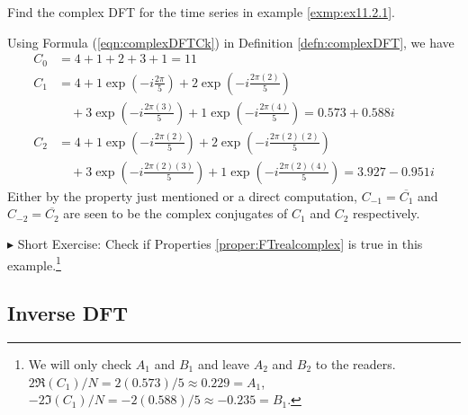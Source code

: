 \begin{exmp}
\label{exmp:ex11.2.2}
Find the complex DFT for the time series in example \ref{exmp:ex11.2.1}.
\end{exmp}
\begin{solution}
Using Formula (\ref{eqn:complexDFTCk}) in Definition \ref{defn:complexDFT}, we have
\begin{align*}
C_0 &= 4+1+2+3+1 = 11 \\
C_1 &= 4 + 1\exp(-i\frac{2\pi}{5}) + 2\exp(-i\frac{2\pi(2)}{5}) \\
&\quad+ 3\exp(-i\frac{2\pi(3)}{5}) + 1\exp(-i\frac{2\pi(4)}{5}) = 0.573 + 0.588i \\
C_2 &= 4 + 1\exp(-i\frac{2\pi(2)}{5}) + 2\exp(-i\frac{2\pi(2)(2)}{5}) \\
&\quad+ 3\exp(-i\frac{2\pi(2)(3)}{5}) + 1\exp(-i\frac{2\pi(2)(4)}{5}) = 3.927 - 0.951i
\end{align*}
Either by the property just mentioned or a direct computation, $C_{-1} = \overline{C_1}$ and $C_{-2} = \overline{C_2}$ are seen to be the complex conjugates of $C_1$ and $C_2$ respectively. 
\end{solution}
$\blacktriangleright$ Short Exercise: Check if Properties \ref{proper:FTrealcomplex} is true in this example.\footnote{We will only check $A_1$ and $B_1$ and leave $A_2$ and $B_2$ to the readers. $2\Re(C_1)/N = 2(0.573)/5 \approx 0.229 = A_1$, $-2\Im(C_1)/N = -2(0.588)/5 \approx -0.235 = B_1$.}

\subsection{Inverse DFT}

